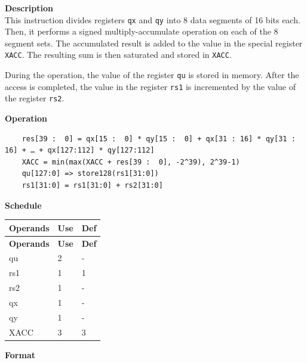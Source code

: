 \textbf{Description}\\
This instruction divides registers \lstinline{qx} and \lstinline{qy} into 8 data segments of 16 bits each. Then, it performs a signed multiply-accumulate operation on each of the 8 segment sets. The accumulated result is added to the value in the special register \lstinline{XACC}. The resulting sum is then saturated and stored in \lstinline{XACC}.

During the operation, the value of the register \lstinline{qu} is stored in memory. After the access is completed, the value in the register \lstinline{rs1} is incremented by the value of the register \lstinline{rs2}.

\textbf{Operation}\\
\begin{lstlisting}
    res[39 :  0] = qx[15 :  0] * qy[15 :  0] + qx[31 : 16] * qy[31 : 16] + … + qx[127:112] * qy[127:112]
    XACC = min(max(XACC + res[39 :  0], -2^39), 2^39-1)
    qu[127:0] => store128(rs1[31:0])
    rs1[31:0] = rs1[31:0] + rs2[31:0]
\end{lstlisting}

\textbf{Schedule}\\
\begin{longtable}[c]{|l|l|l|}
    \hline
    \rowcolor{lightgray}
    \textbf{Operands} & \textbf{Use} & \textbf{Def} \\\hline
    \endfirsthead
    \hline
    \rowcolor{lightgray}
     \textbf{Operands} & \textbf{Use} & \textbf{Def} \\\hline
    \endhead
    \hline
    \endfoot

    qu & 2 & - \\\hline
    rs1 & 1 & 1 \\\hline
    rs2 & 1 & - \\\hline
     qx & 1 & - \\\hline
     qy & 1 & - \\\hline
     XACC & 3 & 3

\end{longtable}

\textbf{Format}\\

